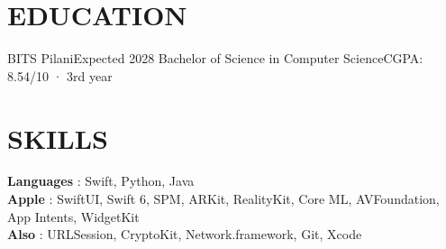 \section{EDUCATION}
  \resumeSubHeadingListStart
    \resumeSubheading
      {BITS Pilani}{Expected 2028}
      {Bachelor of Science in Computer Science}{CGPA: 8.54/10 · 3rd year}
  \resumeSubHeadingListEnd

\section{SKILLS}
 \begin{itemize}[leftmargin=0in, label={}]
    \small{\item{
     \textbf{Languages} {: Swift, Python, Java} \vspace{1pt} \\
     \textbf{Apple} {: SwiftUI, Swift 6, SPM, ARKit, RealityKit, Core ML, AVFoundation, App Intents, WidgetKit} \vspace{1pt} \\
     \textbf{Also} {: URLSession, CryptoKit, Network.framework, Git, Xcode}
    }}
 \end{itemize}


